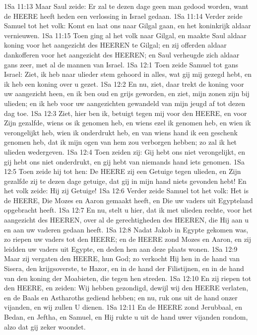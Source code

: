 1Sa 11:13  Maar Saul zeide: Er zal te dezen dage geen man gedood worden, want de HEERE heeft heden een verlossing in Israel gedaan.
1Sa 11:14  Verder zeide Samuel tot het volk: Komt en laat ons naar Gilgal gaan, en het koninkrijk aldaar vernieuwen.
1Sa 11:15  Toen ging al het volk naar Gilgal, en maakte Saul aldaar koning voor het aangezicht des HEEREN te Gilgal; en zij offerden aldaar dankofferen voor het aangezicht des HEEREN; en Saul verheugde zich aldaar gans zeer, met al de mannen van Israel.
1Sa 12:1  Toen zeide Samuel tot gans Israel: Ziet, ik heb naar ulieder stem gehoord in alles, wat gij mij gezegd hebt, en ik heb een koning over u gezet.
1Sa 12:2  En nu, ziet, daar trekt de koning voor uw aangezicht heen, en ik ben oud en grijs geworden, en ziet, mijn zonen zijn bij ulieden; en ik heb voor uw aangezichten gewandeld van mijn jeugd af tot dezen dag toe.
1Sa 12:3  Ziet, hier ben ik, betuigt tegen mij voor den HEERE, en voor Zijn gezalfde, wiens os ik genomen heb, en wiens ezel ik genomen heb, en wien ik verongelijkt heb, wien ik onderdrukt heb, en van wiens hand ik een geschenk genomen heb, dat ik mijn ogen van hem zou verborgen hebben; zo zal ik het ulieden wedergeven.
1Sa 12:4  Toen zeiden zij: Gij hebt ons niet verongelijkt, en gij hebt ons niet onderdrukt, en gij hebt van niemands hand iets genomen.
1Sa 12:5  Toen zeide hij tot hen: De HEERE zij een Getuige tegen ulieden, en Zijn gezalfde zij te dezen dage getuige, dat gij in mijn hand niets gevonden hebt! En het volk zeide: Hij zij Getuige!
1Sa 12:6  Verder zeide Samuel tot het volk: Het is de HEERE, Die Mozes en Aaron gemaakt heeft, en Die uw vaders uit Egypteland opgebracht heeft.
1Sa 12:7  En nu, stelt u hier, dat ik met ulieden rechte, voor het aangezicht des HEEREN, over al de gerechtigheden des HEEREN, die Hij aan u en aan uw vaderen gedaan heeft.
1Sa 12:8  Nadat Jakob in Egypte gekomen was, zo riepen uw vaders tot den HEERE; en de HEERE zond Mozes en Aaron, en zij leidden uw vaders uit Egypte, en deden hen aan deze plaats wonen.
1Sa 12:9  Maar zij vergaten den HEERE, hun God; zo verkocht Hij hen in de hand van Sisera, den krijgsoverste, te Hazor, en in de hand der Filistijnen, en in de hand van den koning der Moabieten, die tegen hen streden.
1Sa 12:10  En zij riepen tot den HEERE, en zeiden: Wij hebben gezondigd, dewijl wij den HEERE verlaten, en de Baals en Astharoths gediend hebben; en nu, ruk ons uit de hand onzer vijanden, en wij zullen U dienen.
1Sa 12:11  En de HEERE zond Jerubbaal, en Bedan, en Jeftha, en Samuel, en Hij rukte u uit de hand uwer vijanden rondom, alzo dat gij zeker woondet.
